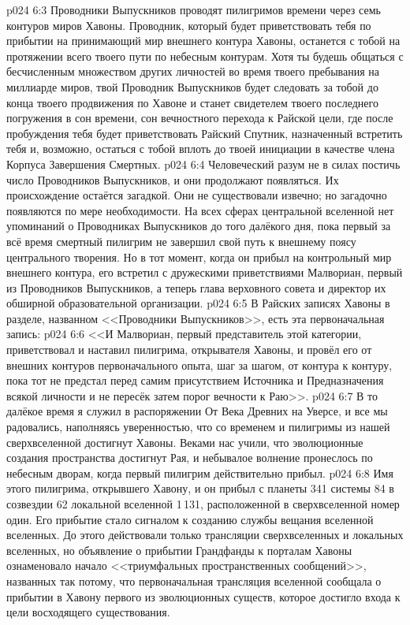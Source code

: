 \vs p024 6:3 Проводники Выпускников проводят пилигримов времени через семь контуров миров Хавоны. Проводник, который будет приветствовать тебя по прибытии на принимающий мир внешнего контура Хавоны, останется с тобой на протяжении всего твоего пути по небесным контурам. Хотя ты будешь общаться с бесчисленным множеством других личностей во время твоего пребывания на миллиарде миров, твой Проводник Выпускников будет следовать за тобой до конца твоего продвижения по Хавоне и станет свидетелем твоего последнего погружения в сон времени, сон вечностного перехода к Райской цели, где после пробуждения тебя будет приветствовать Райский Спутник, назначенный встретить тебя и, возможно, остаться с тобой вплоть до твоей инициации в качестве члена Корпуса Завершения Смертных.
\vs p024 6:4 \pc Человеческий разум не в силах постичь число Проводников Выпускников, и они продолжают появляться. Их происхождение остаётся загадкой. Они не существовали извечно; но загадочно появляются по мере необходимости. На всех сферах центральной вселенной нет упоминаний о Проводниках Выпускников до того далёкого дня, пока первый за всё время смертный пилигрим не завершил свой путь к внешнему поясу центрального творения. Но в тот момент, когда он прибыл на контрольный мир внешнего контура, его встретил с дружескими приветствиями Малвориан, первый из Проводников Выпускников, а теперь глава верховного совета и директор их обширной образовательной организации.
\vs p024 6:5 В Райских записях Хавоны в разделе, названном <<Проводники Выпускников>>, есть эта первоначальная запись:
\vs p024 6:6 <<И Малвориан, первый представитель этой категории, приветствовал и наставил пилигрима, открывателя Хавоны, и провёл его от внешних контуров первоначального опыта, шаг за шагом, от контура к контуру, пока тот не предстал перед самим присутствием Источника и Предназначения всякой личности и не пересёк затем порог вечности к Раю>>.
\vs p024 6:7 В то далёкое время я служил в распоряжении От Века Древних на Уверсе, и все мы радовались, наполняясь уверенностью, что со временем и пилигримы из нашей сверхвселенной достигнут Хавоны. Веками нас учили, что эволюционные создания пространства достигнут Рая, и небывалое волнение пронеслось по небесным дворам, когда первый пилигрим действительно прибыл.
\vs p024 6:8 \pc Имя этого пилигрима, открывшего Хавону,  и он прибыл с планеты 341 системы 84 в созвездии 62 локальной вселенной 1\,131, расположенной в сверхвселенной номер один. Его прибытие стало сигналом к созданию службы вещания вселенной вселенных. До этого действовали только трансляции сверхвселенных и локальных вселенных, но объявление о прибытии Грандфанды к порталам Хавоны ознаменовало начало <<триумфальных пространственных сообщений>>, названных так потому, что первоначальная трансляция вселенной сообщала о прибытии в Хавону первого из эволюционных существ, которое достигло входа к цели восходящего существования.
